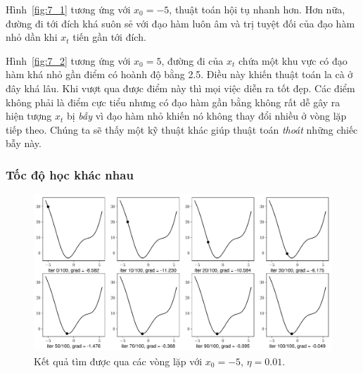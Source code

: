 


Hình~\ref{fig:7_1} tương ứng với $x_{0} = -5$, thuật toán hội tụ nhanh hơn. Hơn
nữa, {đường đi} tới đích khá suôn sẻ với đạo hàm luôn âm và trị tuyệt đối của
đạo hàm nhỏ dần khi $x_t$ tiến gần tới đích.

Hình~\ref{fig:7_2} tương ứng với $x_{0} = 5 $, {đường đi} của $x_t$ chứa một
khu vực có đạo hàm khá nhỏ gần điểm có hoành độ bằng 2.5. Điều này khiến thuật
toán {la cà} ở đây khá lâu. Khi vượt qua được điểm này thì mọi việc diễn ra tốt
đẹp. Các điểm không phải là điểm cực tiểu nhưng có đạo hàm gần bằng không rất dễ
gây ra hiện tượng $x_t$ bị \textit{bẫy} vì đạo hàm nhỏ khiến nó không thay đổi
nhiều ở vòng lặp tiếp theo. Chúng ta sẽ thấy một kỹ thuật khác giúp thuật toán
\textit{thoát} những chiếc bẫy này.

\subsubsection{Tốc độ học khác nhau}


\begin{figure}[t]
\centering
\includegraphics[width =
.975\textwidth]{ebookML_src/src/grad_descent/gd1d_1.pdf}
\caption[]{Kết quả tìm được qua các vòng lặp với $x_0 = -5$, $\eta = 0.01$.}
\label{fig:7_3}
\end{figure}

